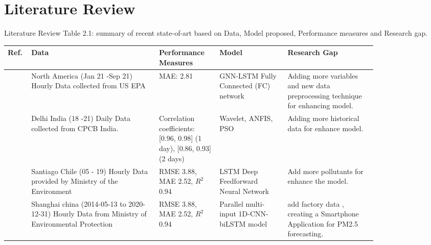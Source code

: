 \documentclass[12pt, aspectratio=169]{beamer}
\begin{document}
\section[Literature]{Literature Review}%
\begin{frame}{Literature Review}
	\centering
	\scriptsize {Table 2.1: summary of recent state-of-art based on Data,  Model proposed,  Performance measures and Research gap.}\\
	\begin{table}
		\centering
		\begin{tabular}{|p{0.03\linewidth}|p{0.3\linewidth}|p{0.14\linewidth}|p{0.16\linewidth}|p{0.21\linewidth}|}
			\hline
			\footnotesize \textbf {Ref.} & \footnotesize \textbf { Data} & \footnotesize \textbf {Performance Measures } & \footnotesize \textbf {Model} & \footnotesize \textbf {Research Gap }  \\ \hline
			\scriptsize \cite{li2023nested}                \scriptsize & North America (Jan 21 -Sep 21)   Hourly Data collected from US EPA                                       \scriptsize & MAE:  2.81                                                                                               \scriptsize & GNN-LSTM Fully Connected (FC) network                              \scriptsize & Adding more variables and new data preprocessing technique for enhancing model.                                    \\ \hline
			\scriptsize \cite{pruthi2022low}           \scriptsize & Delhi  India (18 -21) Daily Data collected from   CPCB India.                                            \scriptsize & Correlation coefficients:  {[}0.96, 0.98{]} (1   day),  {[}0.86, 0.93{]} (2 days) \scriptsize & Wavelet,  ANFIS,  PSO                                                 \scriptsize &  Adding more historical data for enhance model.                                                  \\ \hline
			\scriptsize \cite{menares2021forecasting}             \scriptsize & Santiago Chile (05 - 19) Hourly   Data provided by Ministry of the Environment                           \scriptsize & RMSE 3.88,  MAE 2.52,  $R^2$ 0.94                                                                            \scriptsize & LSTM Deep Feedforward Neural Network                               \scriptsize & Add more pollutants for enhance the model.               \\ \hline
			\scriptsize \cite{zhu2023investigation}            \scriptsize & Shanghai china (2014-05-13 to 2020-12-31)   Hourly Data from Ministry of Environmental Protection \scriptsize & RMSE 3.88,  MAE 2.52,  $R^2$ 0.94                                                                            \scriptsize & Parallel multi-input 1D-CNN-biLSTM   model                          \scriptsize & add  factory data ,  creating a Smartphone Application for PM2.5 forecasting.                                                         \\ \hline
	 \end{tabular}
	\end{table}
\end{frame}
\end{document}
